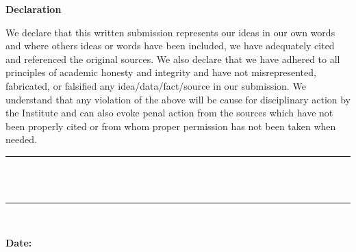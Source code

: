 \documentclass[12pt]{article}
\begin{document}
\begin{center}
    {\Large \textbf{Declaration}}
\end{center}

\vspace{0.5cm}

\justifying

We declare that this written submission represents our ideas in our own
words and where others ideas or words have been included, we have adequately
cited and referenced the original sources. We also declare that we have adhered to
all principles of academic honesty and integrity and have not misrepresented, 
fabricated, or falsified any idea/data/fact/source in our submission. We understand
that any violation of the above will be cause for disciplinary action by the Institute
and can also evoke penal action from the sources which have not been properly
cited or from whom proper permission has not been taken when needed.    

\vspace{2cm}

\begin{flushright}
    \rule{6cm}{0.5pt} \\[-0.4cm]
     \\[0.5cm]
    \rule{6cm}{0.5pt} \\[-0.4cm]
\end{flushright}

\vfill

\noindent
\textbf{Date:}\\[2em]
\end{document}
